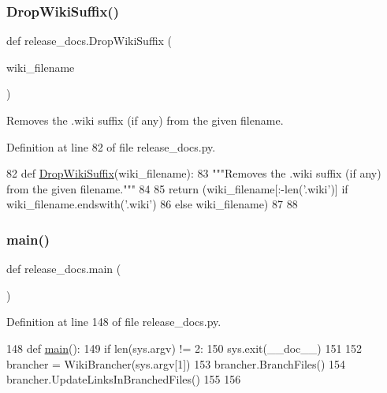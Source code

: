\subsubsection{\texorpdfstring{Drop\+Wiki\+Suffix()}{DropWikiSuffix()}}
{\footnotesize\ttfamily def release\+\_\+docs.\+Drop\+Wiki\+Suffix (\begin{DoxyParamCaption}\item[{}]{wiki\+\_\+filename }\end{DoxyParamCaption})}

\begin{DoxyVerb}Removes the .wiki suffix (if any) from the given filename.\end{DoxyVerb}
 

Definition at line 82 of file release\+\_\+docs.\+py.


\begin{DoxyCode}
82 \textcolor{keyword}{def }\hyperlink{namespacerelease__docs_a6ea19a5ee397ce9f0565b90943d50e7f}{DropWikiSuffix}(wiki\_filename):
83   \textcolor{stringliteral}{"""Removes the .wiki suffix (if any) from the given filename."""}
84 
85   \textcolor{keywordflow}{return} (wiki\_filename[:-len(\textcolor{stringliteral}{'.wiki'})] \textcolor{keywordflow}{if} wiki\_filename.endswith(\textcolor{stringliteral}{'.wiki'})
86           \textcolor{keywordflow}{else} wiki\_filename)
87 
88 
\end{DoxyCode}
\mbox{\label{namespacerelease__docs_ac4eb92814ebe701e3936d1bfdd2ecf73}} 
\subsubsection{\texorpdfstring{main()}{main()}}
{\footnotesize\ttfamily def release\+\_\+docs.\+main (\begin{DoxyParamCaption}{ }\end{DoxyParamCaption})}



Definition at line 148 of file release\+\_\+docs.\+py.


\begin{DoxyCode}
148 \textcolor{keyword}{def }\hyperlink{namespacerelease__docs_ac4eb92814ebe701e3936d1bfdd2ecf73}{main}():
149   \textcolor{keywordflow}{if} len(sys.argv) != 2:
150     sys.exit(\_\_doc\_\_)
151 
152   brancher = WikiBrancher(sys.argv[1])
153   brancher.BranchFiles()
154   brancher.UpdateLinksInBranchedFiles()
155 
156 
\end{DoxyCode}


